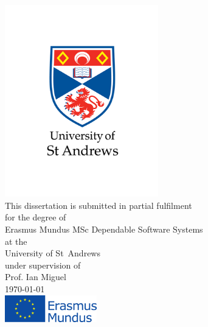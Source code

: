\begin{titlepage}

\begin{center}
	
	\Huge
	{\bfseries \inserttitle}\\[1.5cm]
	
	\Large
	\insertauthor\\
	\includegraphics[width=0.5\textwidth]{standrews_logo}\\
	\small
	This dissertation is submitted in partial fulfilment\\
	for the degree of\\
	\normalsize
	Erasmus Mundus MSc Dependable Software Systems\\
	\small
	at the\\
	\normalsize
	University of St~Andrews\\
	\small
	under supervision of\\
	\normalsize
	Prof. Ian Miguel\\[1cm]
	\today\\[0.5cm]
	\includegraphics[width=0.3\textwidth]{erasmus_mundus_EU}\\[2cm]
	
\end{center}

\end{titlepage}